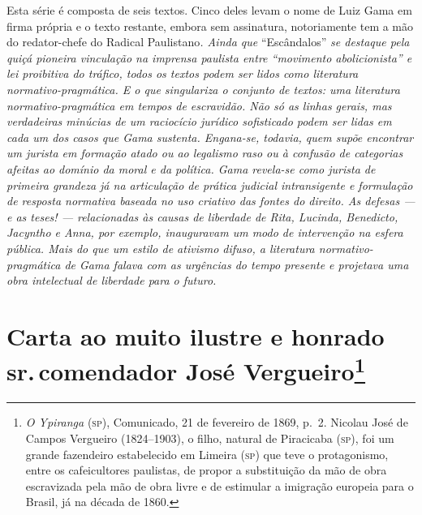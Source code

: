 \begin{argumento}
Esta série é composta de seis textos. Cinco deles levam o nome de Luiz
Gama em firma própria e o texto restante, embora sem assinatura,
notoriamente tem a mão do redator-chefe do Radical Paulistano\emph{.
Ainda que} ``Escândalos'' \emph{se destaque pela quiçá pioneira vinculação
na imprensa paulista entre ``movimento abolicionista'' e lei proibitiva do
tráfico, todos os textos podem ser lidos como literatura
normativo-pragmática. E o que singulariza o conjunto de textos: uma
literatura normativo-pragmática em tempos de escravidão. Não só as
linhas gerais, mas verdadeiras minúcias de um raciocício jurídico
sofisticado podem ser lidas em cada um dos casos que Gama sustenta.
Engana-se, todavia, quem supõe encontrar um jurista em formação atado ou
ao legalismo raso ou à confusão de categorias afeitas ao domínio da
moral e da política. Gama revela-se como jurista de primeira grandeza já
na articulação de prática judicial intransigente e formulação de
resposta normativa baseada no uso criativo das fontes do direito. As
defesas --- e as teses! --- relacionadas às causas de liberdade de Rita,
Lucinda, Benedicto, Jacyntho e Anna, por exemplo, inauguravam um modo de
intervenção na esfera pública. Mais do que um estilo de ativismo difuso,
a literatura normativo-pragmática de Gama falava com as urgências do
tempo presente e projetava uma obra intelectual de liberdade para o
futuro.}
\end{argumento}

\chapter{Carta ao muito ilustre e honrado sr.\,comendador José
Vergueiro\footnote{\emph{O Ypiranga} (\textsc{sp}), Comunicado, 21 de fevereiro de 1869,
  p.~2. Nicolau José de Campos Vergueiro (1824--1903), o filho, natural
  de Piracicaba (\textsc{sp}), foi um grande fazendeiro estabelecido em Limeira
  (\textsc{sp}) que teve o protagonismo, entre os cafeicultores paulistas, de
  propor a substituição da mão de obra escravizada pela mão de obra
  livre e de estimular a imigração europeia para o Brasil, já na década
  de 1860.}}

